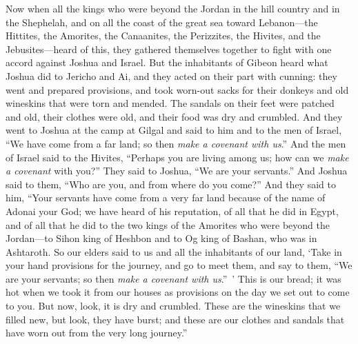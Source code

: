 \begin{biblechapter} %
 Now when all the kings who were beyond the Jordan in the hill country and in the Shephelah, and on all the coast of the great sea toward Lebanon—the Hittites, the Amorites, the Canaanites, the Perizzites, the Hivites, and the Jebusites—heard of this,
\verse they gathered themselves together to fight with one accord against Joshua and Israel.
\verse But the inhabitants of Gibeon heard what Joshua did to Jericho and Ai,
\verse and they acted on their part with cunning: they went and prepared provisions, and took worn-out sacks for their donkeys and old wineskins that were torn and mended.
\verse The sandals on their feet were patched and old, their clothes were old, and their food was dry and crumbled.
\verse And they went to Joshua at the camp at Gilgal and said to him and to the men of Israel, “We have come from a far land; so then \textit{make a covenant with us}.”
\verse And the men of Israel said to the Hivites, “Perhaps you are living among us; how can we \textit{make a covenant} with you?”
\verse They said to Joshua, “We are your servants.” And Joshua said to them, “Who are you, and from where do you come?”
\verse And they said to him, “Your servants have come from a very far land because of the name of Adonai your God; we have heard of his reputation, of all that he did in Egypt,
\verse and of all that he did to the two kings of the Amorites who were beyond the Jordan—to Sihon king of Heshbon and to Og king of Bashan, who was in Ashtaroth.
\verse So our elders said to us and all the inhabitants of our land, ‘Take in your hand provisions for the journey, and go to meet them, and say to them, “We are your servants; so then \textit{make a covenant with us}.” ’
\verse This is our bread; it was hot when we took it from our houses as provisions on the day we set out to come to you. But now, look, it is dry and crumbled.
\verse These are the wineskins that we filled new, but look, they have burst; and these are our clothes and sandals that have worn out from the very long journey.”

\end{biblechapter}
